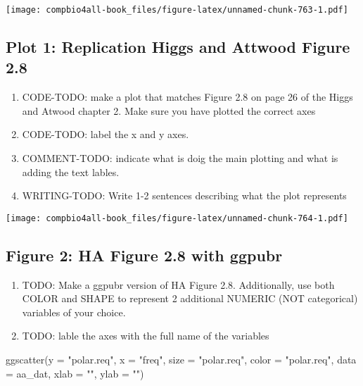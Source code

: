 \documentclass[
]{book}
\newenvironment{Shaded}{\begin{snugshade}}{\end{snugshade}}
\newcommand{\AttributeTok}[1]{\textcolor[rgb]{0.77,0.63,0.00}{#1}}
\newcommand{\FunctionTok}[1]{\textcolor[rgb]{0.00,0.00,0.00}{#1}}
\newcommand{\NormalTok}[1]{#1}
\newcommand{\StringTok}[1]{\textcolor[rgb]{0.31,0.60,0.02}{#1}}
\providecommand{\tightlist}{%
  \setlength{\itemsep}{0pt}\setlength{\parskip}{0pt}}
\begin{document}
\texttt{[image: compbio4all-book\_files/figure-latex/unnamed-chunk-763-1.pdf]}

\hypertarget{plot-1-replication-higgs-and-attwood-figure-2.8}{%
\subsection{Plot 1: Replication Higgs and Attwood Figure 2.8}\label{plot-1-replication-higgs-and-attwood-figure-2.8}}

\begin{enumerate}
\def\labelenumi{\arabic{enumi}.}
\tightlist
\item
  CODE-TODO: make a plot that matches Figure 2.8 on page 26 of the Higgs and Atwood chapter 2. Make sure you have plotted the correct axes
\item
  CODE-TODO: label the x and y axes.
\item
  COMMENT-TODO: indicate what is doig the main plotting and what is adding the text lables.
\item
  WRITING-TODO: Write 1-2 sentences describing what the plot represents
\end{enumerate}

\texttt{[image: compbio4all-book\_files/figure-latex/unnamed-chunk-764-1.pdf]}

\hypertarget{figure-2-ha-figure-2.8-with-ggpubr}{%
\subsection{Figure 2: HA Figure 2.8 with ggpubr}\label{figure-2-ha-figure-2.8-with-ggpubr}}

\begin{enumerate}
\def\labelenumi{\arabic{enumi}.}
\tightlist
\item
  TODO: Make a ggpubr version of HA Figure 2.8. Additionally, use both COLOR and SHAPE to represent 2 additional NUMERIC (NOT categorical) variables of your choice.
\item
  TODO: lable the axes with the full name of the variables
\end{enumerate}

\begin{Shaded}
\begin{Highlighting}[]
\FunctionTok{ggscatter}\NormalTok{(}\AttributeTok{y =} \StringTok{"polar.req"}\NormalTok{,}
          \AttributeTok{x =} \StringTok{"freq"}\NormalTok{,}
          \AttributeTok{size =} \StringTok{"polar.req"}\NormalTok{,}
          \AttributeTok{color =} \StringTok{"polar.req"}\NormalTok{,}
          \AttributeTok{data =}\NormalTok{ aa\_dat,}
          \AttributeTok{xlab =} \StringTok{""}\NormalTok{,}
          \AttributeTok{ylab =} \StringTok{""}\NormalTok{)}
\end{Highlighting}
\end{Shaded}
\end{document}
